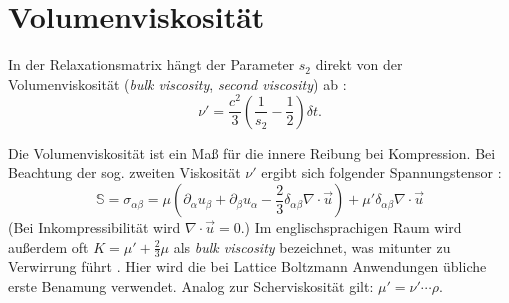 \section{Volumenviskosität}
In der Relaxationsmatrix hängt der Parameter $s_2$ direkt von der Volumenviskosität (\emph{bulk viscosity}, \emph{second viscosity}) ab \cite{Guo2013}:
\begin{equation}
 \nu' = \frac{c^2}{3} \left( \frac{1}{s_2} - \frac{1}{2} \right)  \delta t.
\end{equation}

Die Volumenviskosität ist ein Maß für die innere Reibung bei Kompression. 
Bei Beachtung der sog. zweiten Viskosität $\nu'$ ergibt sich folgender Spannungstensor \cite{Dellar2001}:
\begin{equation}
\label{eq:Spannungsmatrix}
 \mathbb{S} = \sigma_{\alpha \beta} = \mu \left( \partial_{\alpha} u_{\beta} + \partial_{\beta} u_{\alpha} - \frac{2}{3} \delta_{\alpha \beta} \nabla \cdot \vec{u} \right) + \mu' \delta_{\alpha \beta} \nabla \cdot \vec{u}
\end{equation}
(Bei Inkompressibilität wird $\nabla \cdot \vec{u} = 0$.)
Im englischsprachigen Raum wird außerdem oft $K = \mu' + \frac{2}{3} \mu$ als \emph{bulk viscosity} bezeichnet, was mitunter zu Verwirrung führt \cite{Rosenhead1954}.
Hier wird die bei Lattice Boltzmann Anwendungen übliche erste Benamung verwendet.
Analog zur Scherviskosität gilt: $\mu' = \nu' \cdots \rho$.

